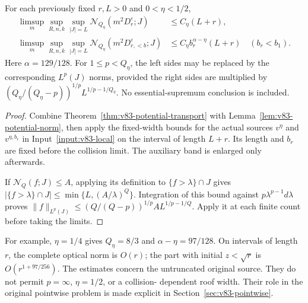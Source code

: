 \begin{theorem}
\label{thm:v83-complete-weak-height}
For each previously fixed $r,L>0$ and $0<\eta<1/2$,
\begin{align}
 \limsup_m\sup_{R,n,k}\sup_{|J|=L}
       \mathcal N_{Q_\eta}(m^2D_r^\varepsilon;J)
                     &\le C_\eta(L+r),\label{eq:v83-weak-height}\\
 \limsup_m\sup_{R,n,k}\sup_{|J|=L}
       \mathcal N_{Q_\eta}(m^2D_{r,<b}^\varepsilon;J)
                     &\le C_\eta b_r^{\alpha-\eta}(L+r)
                      \quad(b_r<b_1).\label{eq:v83-critical-weak-height}
\end{align}
Here $\alpha=129/128$. For $1\le p<Q_\eta$, the left sides may be
replaced by the corresponding $L^p(J)$ norms, provided the right
sides are multiplied by
$(Q_\eta/(Q_\eta-p))^{1/p}L^{1/p-1/Q_\eta}$.
No essential-supremum conclusion is included.
\end{theorem}
\begin{proof}
Combine Theorem~\ref{thm:v83-potential-transport} with
Lemma~\ref{lem:v83-potential-norm}, then apply the fixed-width bounds
for the actual sources $v^\eta$ and $v^{\eta,b_r}$ in
Input~\ref{input:v83-local} on the interval of length $L+r$.
Its length and $b_r$ are fixed before the collision limit. The
auxiliary band is enlarged only afterwards.

If $\mathcal N_Q(f;J)\le A$, applying its definition to
$\{f>\lambda\}\cap J$ gives
$|\{f>\lambda\}\cap J|\le\min\{L,(A/\lambda)^Q\}$.
Integration of this bound against $p\lambda^{p-1}d\lambda$ proves
$\|f\|_{L^p(J)}\le (Q/(Q-p))^{1/p}A L^{1/p-1/Q}$.
Apply it at each finite count before taking the limits.
\end{proof}

For example, $\eta=1/4$ gives $Q_\eta=8/3$ and
$\alpha-\eta=97/128$. On intervals of length $r$, the complete
optical norm is $O(r)$; the part with initial $z<\sqrt r$ is
$O(r^{1+97/256})$. The estimates concern the untruncated original
source. They do not permit $p=\infty$, $\eta=1/2$, or a collision-
dependent roof width. Their role in the original pointwise problem
is made explicit in Section~\ref{sec:v83-pointwise}.
